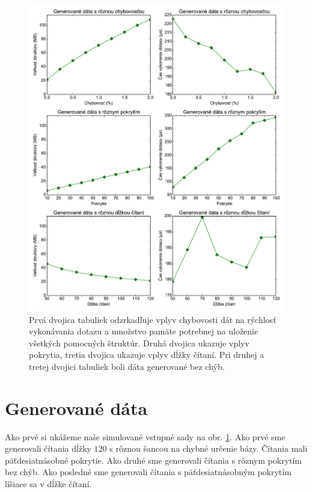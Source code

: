 \begin{figure}

\centerline{\includegraphics[width=1\textwidth]{images/chart_artificial.pdf}}

\caption[Simulované dáta]{Prvá dvojica tabuliek odzrkadľuje vplyv chybovosti dát na rýchlosť vykonávania dotazu a množstvo
pamäte potrebnej na uloženie všetkých pomocných štruktúr. Druhá dvojica ukazuje vplyv pokrytia,
tretia dvojica ukazuje vplyv dĺžky čítaní. Pri druhej a tretej dvojici tabuliek boli dáta generované
bez chýb.}

\label{chart:artificial}

\end{figure}

\section{Generované dáta}

Ako prvé si ukážeme naše simulované vstupné sady na obr. \ref{chart:artificial}. Ako prvé sme
generovali čítania dĺžky $120$ s rôznou šancou na chybné určenie bázy. Čítania mali
päťdesiatnásobné pokrytie. Ako druhé sme generovali čítania s rôznym pokrytím bez chýb.
Ako posledné sme generovali čítania s päťdesiatnásobným pokrytím líšiace sa v dĺžke
čítaní.

